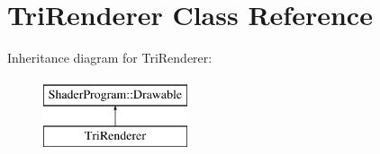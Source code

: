 \hypertarget{class_tri_renderer}{}\section{Tri\+Renderer Class Reference}
\label{class_tri_renderer}
Inheritance diagram for Tri\+Renderer\+:\begin{figure}[H]
\begin{center}
\leavevmode
\includegraphics[height=2.000000cm]{class_tri_renderer}
\end{center}
\end{figure}
